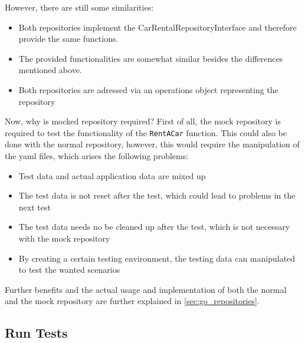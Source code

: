 However, there are still some similarities:
\begin{itemize}
      \item Both repositories implement the CarRentalRepositoryInterface and therefore provide the same functions.
      \item The provided functionalities are somewhat similar besides the differences mentioned above.
      \item Both repositories are adressed via an operations object representing the repository
\end{itemize}

Now, why is mocked repository required?
First of all, the mock repository is required to test the functionality of the \texttt{RentACar} function.
This could also be done with the normal repository, however, this would require the manipulation of the yaml files, which arises the following problems:
\begin{itemize}
      \item Test data and actual application data are mixed up
      \item The test data is not reset after the test, which could lead to problems in the next test
      \item The test data needs no be cleaned up after the test, which is not necessary with the mock repository
      \item By creating a certain testing environment, the testing data can manipulated to test the wanted scenarios
\end{itemize}

Further benefits and the actual usage and implementation of both the normal and the mock repository are further explained in \ref*{sec:go_repositories}.

\subsection*{Run Tests}
